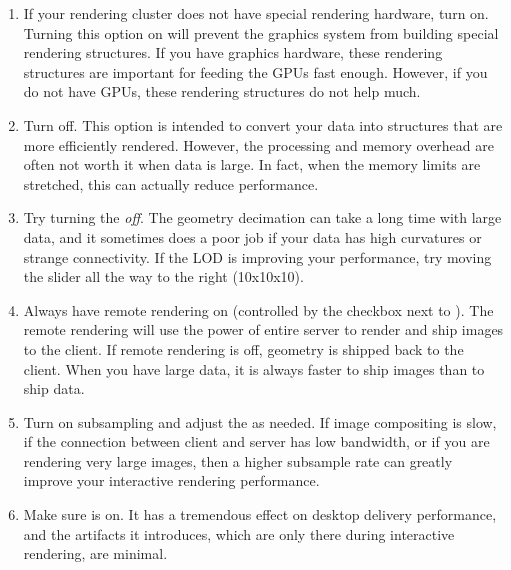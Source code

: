\begin{enumerate}
\item If your rendering cluster does not have special rendering hardware,
  turn  on.  Turning this option on will
  prevent the graphics system from building special rendering structures.
  If you have graphics hardware, these rendering structures are important
  for feeding the GPUs fast enough.  However, if you do not have GPUs,
  these rendering structures do not help much.
\item Turn  off.  This option is intended to
  convert your data into structures that are more efficiently rendered.
  However, the processing and memory overhead are often not worth it when
  data is large.  In fact, when the memory limits are stretched, this can
  actually reduce performance.
\item Try turning the  \emph{off}.  The geometry
  decimation can take a long time with large data, and it sometimes does a
  poor job if your data has high curvatures or strange connectivity.  If
  the LOD is improving your performance, try moving the  slider all the way to the right (10x10x10).
\item Always have remote rendering on (controlled by the checkbox next to
  ).  The remote rendering will use the power
  of entire server to render and ship images to the client.  If remote
  rendering is off, geometry is shipped back to the client.  When you have
  large data, it is always faster to ship images than to ship data.
\item Turn on subsampling and adjust the  as needed.
  If image compositing is slow, if the connection between client and server
  has low bandwidth, or if you are rendering very large images, then a
  higher subsample rate can greatly improve your interactive rendering
  performance.
\item Make sure  is on.  It has a tremendous effect
  on desktop delivery performance, and the artifacts it introduces, which
  are only there during interactive rendering, are minimal.
\end{enumerate}


